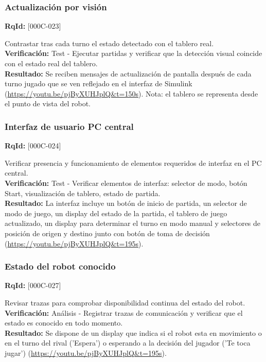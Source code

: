 \documentclass[12pt,a4paper]{article}
\begin{document}
\subsubsection{Actualización por visión}
\textbf{RqId:} [000C-023]
\vspace{0.3em}
\par Contrastar tras cada turno el estado detectado con el tablero real.
\\ \textbf{Verificación:} Test - Ejecutar partidas y verificar que la detección visual coincide con el estado real del tablero.
\\ \textbf{Resultado:} Se reciben mensajes de actualización de pantalla después de cada turno jugado que se ven reflejado en el interfaz de Simulink (\url{https://youtu.be/pjByXUHJplQ&t=150s}). Nota: el tablero se representa desde el punto de vista del robot.

\subsubsection{Interfaz de usuario PC central}
\textbf{RqId:} [000C-024]
\vspace{0.3em}
\par Verificar presencia y funcionamiento de elementos requeridos de interfaz en el PC central.
\\ \textbf{Verificación:} Test - Verificar elementos de interfaz: selector de modo, botón Start, visualización de tablero, estado de partida.
\\ \textbf{Resultado:} La interfaz incluye un botón de inicio de partida, un selector de modo de juego, un display del estado de la partida, el tablero de juego actualizado, un display para determinar el turno en modo manual y selectores de posición de origen y destino junto con botón de toma de decisión (\url{https://youtu.be/pjByXUHJplQ&t=195s}).

\subsubsection{Estado del robot conocido}
\textbf{RqId:} [000C-027]
\vspace{0.3em}
\par Revisar trazas para comprobar disponibilidad continua del estado del robot.
\\ \textbf{Verificación:} Análisis - Registrar trazas de comunicación y verificar que el estado es conocido en todo momento.
\\ \textbf{Resultado:} Se dispone de un display que indica si el robot esta en movimiento o en el turno del rival ('Espera') o esperando a la decisión del jugador ('Te toca jugar') (\url{https://youtu.be/pjByXUHJplQ&t=195s}).
\end{document}
